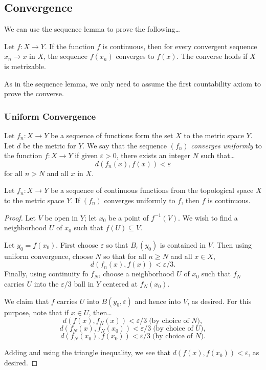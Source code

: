 \subsection{Convergence}\label{metricconvergence}
\noindent We can use the sequence lemma to prove the following\dots
\begin{theorem}
Let $f : X \rightarrow Y$. If the function $f$ is continuous, then for every convergent sequence $x_n \rightarrow x$ in $X$, the sequence
$f(x_n)$ converges to $f(x)$. The converse holds if $X$ is metrizable.
\end{theorem}
\noindent As in the sequence lemma, we only need to assume the first countability axiom to prove the converse.

\subsubsection{Uniform Convergence}\label{uniformconvergence}
Let $f_n : X \rightarrow Y$ be a sequence of functions form the set $X$ to the metric space $Y$. Let
$d$ be the metric for $Y$. We say that the sequence $(f_n)$ \emph{converges uniformly} to the function $f: X \rightarrow Y$
if given $\varepsilon > 0$, there exists an integer $N$ such that\dots
$$d(f_n(x), f(x)) < \varepsilon$$
for all $n > N$ and all $x$ in $X$.

\begin{theorem}
Let $f_n : X \rightarrow Y$ be a sequence of continuous functions from the topological space $X$ to the metric space $Y$.
If $(f_n)$ converges uniformly to $f$, then $f$ is continuous.
\end{theorem}

\begin{proof}
Let $V$ be open in $Y$; let $x_0$ be a point of $f^{-1}(V).$ We wish to find a neighborhood $U$ of $x_0$ such that $f(U) \subseteq V$.

Let $y_0 = f(x_0)$. First choose $\varepsilon$ so that $B_{\varepsilon}(y_0)$ is contained in $V$. Then using uniform convergence,
choose $N$ so that for all $n \geq N$ and all $x \in X$,
$$d(f_n(x),f(x)) < \varepsilon / 3.$$
Finally, using continuity fo $f_N$, choose a neighborhood $U$ of $x_0$ such that $f_N$ carries $U$ into the $\varepsilon / 3$ ball
in $Y$ centered at $f_N(x_0)$.

We claim that $f$ carries $U$ into $B(y_0,\varepsilon)$ and hence into $V$, as desired. For this purpose, note that if $x \in U$, then\dots
$$d(f(x), f_N(x)) < \varepsilon/3 \; \textrm{(by choice of } N \textrm{)},$$
$$d(f_N(x), f_N(x_0)) < \varepsilon/3 \; \textrm{(by choice of } U \textrm{)},$$
$$d(f_N(x_0), f(x_0)) < \varepsilon/3 \; \textrm{(by choice of } N \textrm{)}.$$

Adding and using the triangle inequality, we see that $d(f(x),f(x_0)) < \varepsilon$, as desired.
\end{proof}

